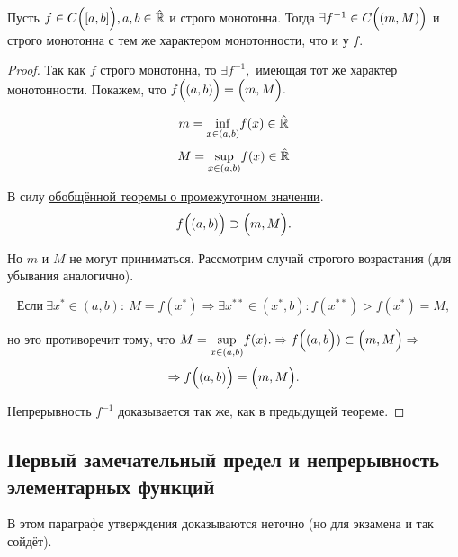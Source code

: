 \begin{corollary}
    Пусть $f \in C\Bigl([a, b] \Bigr), a, b \in \Hat{\mathbb{R}}$ и строго монотонна. Тогда $\exists f^{-1} \in C\Bigl( (m, M )\Bigr)$ и строго монотонна с тем же характером монотонности, что и у $f$.
\end{corollary}
\begin{proof}
    Так как $f$ строго монотонна, то $\exists f^{-1},$ имеющая тот же характер монотонности. Покажем, что $f\Bigl((a,b)\Bigr) = \Bigl(m, M \Bigr).$

    $$m = \underset{x\in (a, b)}{\inf} f(x) \in \Hat{\mathbb{R}}
    $$
    $$M = \underset{x\in (a, b)}{\sup} f(x) \in \Hat{\mathbb{R}}
    $$
    
    В силу \hyperlink{thrm4.15}{обобщённой теоремы о промежуточном значении}. 
    $$f\Bigl((a,b)\Bigr) \supset \Bigl(m, M \Bigr).$$

    Но $m$ и $M$ не могут приниматься. Рассмотрим случай строгого возрастания (для убывания аналогично). 
    
    $$\textrm{Если}\ \exists x^{*} \in (a, b): \  M = f(x^{*}) \Rightarrow \exists x^{**} \in (x^{*}, b): f(x^{**}) > f(x^{*}) = M,$$ 
    
    но это противоречит тому, что $M = \underset{x\in (a, b)}{\sup} f(x). \Rightarrow f\Bigl((a, b\Bigr)) \subset \Bigl(m, M \Bigr) \Rightarrow $
    $$\Rightarrow f\Bigl((a, b)\Bigr) = \Bigl(m, M \Bigr).$$

    Непрерывность $f^{-1}$ доказывается так же, как в предыдущей теореме.
\end{proof}


\subsection{Первый замечательный предел и непрерывность элементарных функций}
\begin{note}
    В этом параграфе утверждения доказываются неточно (но для экзамена и так сойдёт).
\end{note}

